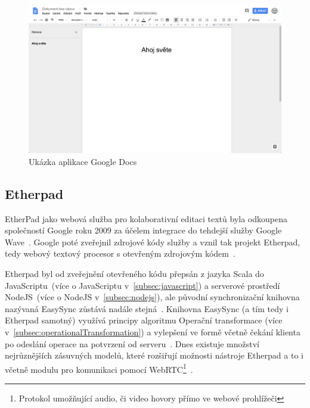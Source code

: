 \begin{figure}[ht]
    \centering
    \includegraphics[width=\textwidth]{partials/analyza/googleDocs}
    \caption{Ukázka aplikace Google Docs}\label{fig:googleDocs}
\end{figure}

\subsection{Etherpad}\label{subsec:etherpad}

EtherPad jako webová služba pro kolaborativní editaci textů byla odkoupena společností Google roku 2009 za účelem integrace do tehdejší služby Google Wave~\cite{etherpad:acquired}.
Google poté zveřejnil zdrojové kódy služby a vznil tak projekt Etherpad, tedy webový textový procesor s otevřeným zdrojovým kódem~\cite{etherpad:openSource}.

Etherpad byl od zveřejnění otevřeného kódu přepsán z jazyka Scala do JavaScriptu~(více o JavaScriptu v~\ref{subsec:javascript}) a serverové prostředí NodeJS~(více o NodeJS v~\ref{subsec:nodejs}), ale původní synchronizační knihovna nazývaná EasySync zůstává nadále stejná~\cite{etherpad:newgithub, etherpad:easySync}.
Knihovna EasySync (a tím tedy i Etherpad samotný) využívá principy algoritmu Operační transformace (více v~\ref{subsec:operationalTransformation}) a vylepšení ve formě včetně čekání klienta po odeslání operace na potvrzení od serveru~\cite{etherpad:easySync}.
Dnes existuje množství nejrůznějších zásuvných modelů, které rozšiřují možnosti nástroje Etherpad a to i včetně modulu pro komunikaci pomocí WebRTC\footnote{Protokol umožňující audio, či video hovory přímo ve webové prohlížeči}~\cite{etherpad:plugins}.

